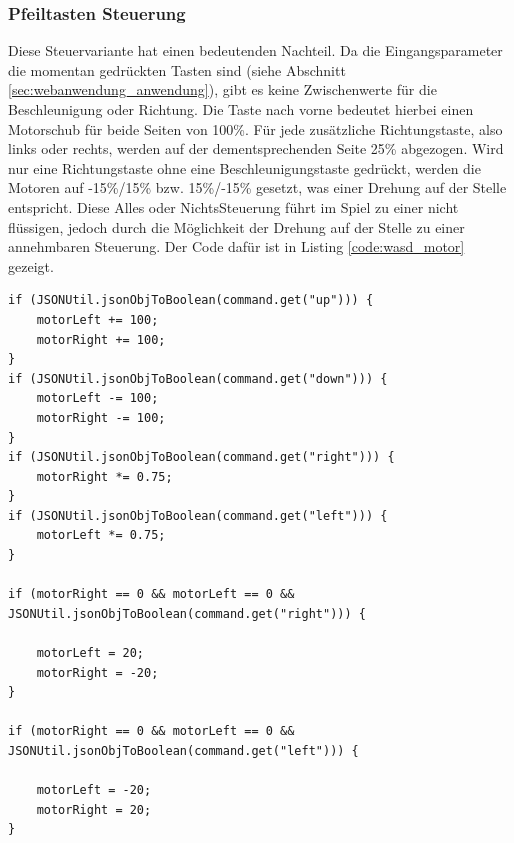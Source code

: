 \subsubsection{Pfeiltasten Steuerung}
\label{sec:webanwendung_server}
Diese Steuervariante hat einen bedeutenden Nachteil. Da die Eingangsparameter die momentan gedrückten Tasten sind (siehe Abschnitt \ref{sec:webanwendung_anwendung}), gibt es keine Zwischenwerte für die Beschleunigung oder Richtung. Die Taste nach vorne bedeutet hierbei einen Motorschub für beide Seiten von 100\%. Für jede zusätzliche Richtungstaste, also links oder rechts, werden auf der dementsprechenden Seite 25\% abgezogen. Wird nur eine Richtungstaste ohne eine Beschleunigungstaste gedrückt, werden die Motoren auf -15\%/15\% bzw. 15\%/-15\% gesetzt, was einer Drehung auf der Stelle entspricht. Diese \glqq Alles oder Nichts\grqq Steuerung führt im Spiel zu einer nicht flüssigen, jedoch durch die Möglichkeit der Drehung auf der Stelle zu einer annehmbaren Steuerung. Der Code dafür ist in Listing \ref{code:wasd_motor} gezeigt.

\begin{lstlisting}[captionpos = b, caption=Umrechnung der Pfeiltasten in Motorbefehle, label = code:wasd_motor]
if (JSONUtil.jsonObjToBoolean(command.get("up"))) {
	motorLeft += 100;
	motorRight += 100;
}
if (JSONUtil.jsonObjToBoolean(command.get("down"))) {
	motorLeft -= 100;
	motorRight -= 100;
}
if (JSONUtil.jsonObjToBoolean(command.get("right"))) {
	motorRight *= 0.75;
}
if (JSONUtil.jsonObjToBoolean(command.get("left"))) {
	motorLeft *= 0.75;
} 

if (motorRight == 0 && motorLeft == 0 &&
JSONUtil.jsonObjToBoolean(command.get("right"))) {

	motorLeft = 20;
	motorRight = -20;
}

if (motorRight == 0 && motorLeft == 0 &&
JSONUtil.jsonObjToBoolean(command.get("left"))) {

	motorLeft = -20;
	motorRight = 20;
}
\end{lstlisting}
 

